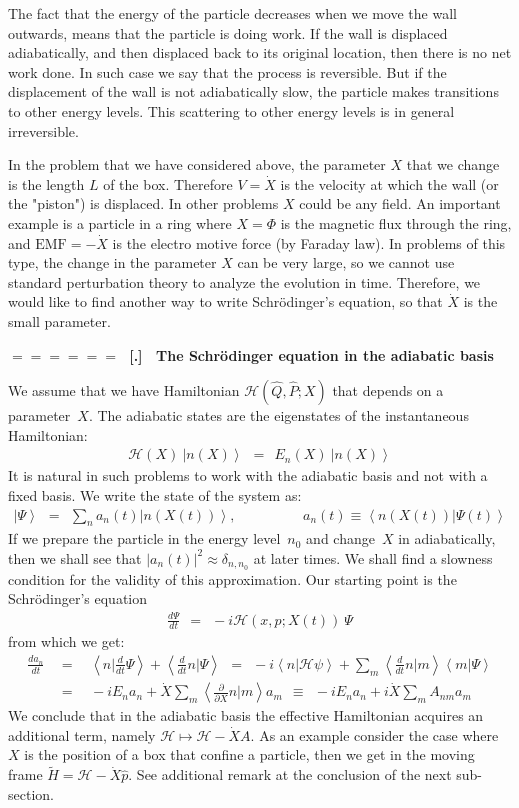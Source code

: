 \documentclass[onecolumn,fleqn]{revtex4}
\newcommand{\beq}{\begin{eqnarray}}
\newcommand{\eeq}{\end{eqnarray}}
\renewcommand{\thesubsection}{\arabic{subsection}}
\renewcommand{\thesubsubsection}{\arabic{subsubsection}}
\newcommand{\sheadC}[1]
{
\addtocounter{subsubsection}{1}
\vspace{5mm}
{\Large\bf $=\!=\!=\!=\!=\!=\;$ [\thesubsection.\thesubsubsection] \ #1}  
\nopagebreak
\phantomsection
}
\begin{document}
The fact that the energy of the particle decreases 
when we move the wall outwards, means that the particle 
is doing work. If the wall is displaced adiabatically, 
and then displaced back to its original location, 
then there is no net work done. In such case 
we say that the process is reversible. 
But if the displacement of the wall is not adiabatically slow, 
the particle makes transitions to other energy levels. 
This scattering to other energy levels is in general irreversible. 

In the problem that we have considered above, 
the parameter $X$ that we change is the length $L$ 
of the box. Therefore ${V=\dot{X}}$ 
is the velocity at which the wall (or the "piston") 
is displaced. In other problems ${X}$ could 
be any field. An important example is 
a particle in a ring where ${X=\Phi}$ is the 
magnetic flux through the ring, 
and ${\mbox{EMF}=-\dot{X}}$ is the electro motive force 
(by Faraday law). In problems of this type, the 
change in the parameter ${X}$ can be very large, 
so we cannot use standard perturbation theory to analyze 
the evolution in time. Therefore, we would like to 
find another way to write Schr\"{o}dinger's equation, 
so that ${\dot{X}}$ is the small parameter.



 
\sheadC{The Schr\"{o}dinger equation in the adiabatic basis} 

We assume that we have Hamiltonian $\mathcal{H}(\hat{Q},\hat{P};X)$ 
that depends on a parameter~$X$. The adiabatic states 
are the eigenstates of the instantaneous Hamiltonian:
\beq
\mathcal{H}(X) \ \left|n(X) \right\rangle \ \ = \ \ E_n(X) \ \left|n(X) \right\rangle 
\eeq
It is natural in such problems to work with the adiabatic 
basis and not with a fixed basis. 
We write the state of the system as:
\beq
\left|\Psi \right\rangle \ \ = \ \ \sum_n a_n(t) \left|n(X(t))\right\rangle, 
\hspace{2cm} a_n(t) \equiv \left\langle n(X(t))|\Psi(t)\right\rangle
\eeq
If we prepare the particle in the energy level~$n_0$ 
and change~$X$ in adiabatically, 
then we shall see that ${|a_n(t)|^2 \approx \delta_{n,n_0}}$ at later times. 
We shall find a slowness condition for the validity of this approximation. 
Our starting point is the Schr\"{o}dinger's equation  
\beq
\frac{d\Psi}{dt} \ \ = \ \ -i\mathcal{H}(x,p;X(t)) \ \Psi
\eeq
from which we get:
\beq
\frac{d a_n}{dt} 
\ \ &=& \ \ 
\left\langle n \Big| \frac{d}{dt} \Psi\right\rangle 
+ \left\langle\frac{d}{dt}n \Big| \Psi\right\rangle 
\ \ = \ \ 
-i\left\langle n\Big|\mathcal{H} \psi \right\rangle 
+ \sum_m\left\langle\frac{d}{dt}n\Big|m\right\rangle \left\langle m \Big| \Psi \right\rangle 
\\
\ \ &=& \ \ 
-i E_n a_n + \dot{X}\sum_m\left\langle \frac{\partial}{\partial X}n\Big|m\right\rangle a_m 
\ \ \equiv \ \ 
-i E_n a_n + i \dot{X}\sum_m A_{nm} a_m  
\eeq
We conclude that in the adiabatic basis the effective Hamiltonian 
acquires an additional term, 
namely ${\mathcal{H} \mapsto \mathcal{H} - \dot{X} A}$. 
As an example consider the case where $X$ is the position 
of a box that confine a particle, 
then we get in the moving frame ${\tilde{H} = \mathcal{H} - \dot{X} \hat{p}}$.  
See additional remark at the conclusion of the next sub-section.
\end{document}

